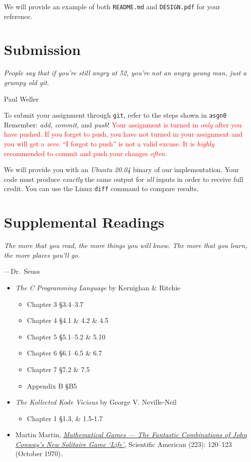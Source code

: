 \documentclass[11pt]{article}
\begin{document}
We will provide an example of both \texttt{README.md} and \texttt{DESIGN.pdf} for your reference.


\section{Submission}
\textwidth
\epigraph{\emph{People say that if you're still angry at 52, you're not an angry young man, just a grumpy old git.}}{Paul Weller}

To submit your assignment through \texttt{git}, refer to the steps shown in
\texttt{asgn0} Remember: \emph{add, commit,} and \emph{push}!
\textcolor{red}{Your assignment is turned in \emph{only} after you have pushed.
If you forget to push, you have not turned in your assignment and you will get a
\emph{zero}. ``I forgot to push'' is not a valid excuse. It is \emph{highly}
recommended to commit and push your changes \emph{often}.}

We will provide you with an \emph{Ubuntu 20.04} binary of our implementation.
Your code must produce \emph{exactly} the same output for \emph{all} inputs in
order to receive full credit. You can use the Linux \texttt{diff} command to 
compare results.


\section{Supplemental Readings}

\epigraph{\emph{The more that you read, the more things you will know. The
more that you learn, the more places you'll go.}}{---Dr.\ Seuss}\noindent

\begin{itemize}
  \item \textit{The C Programming Language} by Kernighan \& Ritchie
    \begin{itemize}
      \item Chapter 3 \S 3.4--3.7
      \item Chapter 4 \S 4.1 \& 4.2 \& 4.5
      \item Chapter 5 \S 5.1--5.2 \& 5.10
      \item Chapter 6 \S 6.1--6.5 \& 6.7
      \item Chapter 7 \S 7.2 \& 7.5
      \item Appendix B \S B5
    \end{itemize}
    
  \item \textit{The Kollected Kode Vicious } by George V. Neville-Neil
  \begin{itemize}
      \item Chapter 1 \S 1.3, \& 1.5-1.7
  \end{itemize}
  
  \item  Martin Martin,
    \href{https://web.stanford.edu/class/sts145/Library/life.pdf}{\emph{Mathematical
    Games --- The Fantastic Combinations of John Conway's New Solitaire Game
`Life',}} Scientific American (223): 120--123 (October 1970).
\end{itemize}
\end{document}
